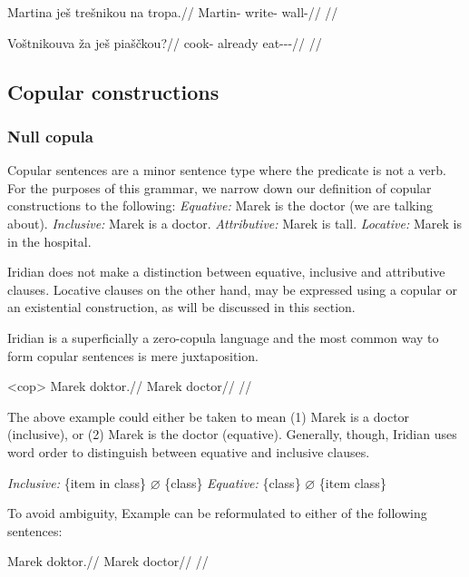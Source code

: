 \pex
\begingl
\gla Martina ješ trešnikou na tropa.//
\glb Martin-\Acc{} \Exst{} write- \Loc{} wall-\Acc{}//
\glft {}//
\endgl
\xe

\pex
\begingl
\gla Voštnikouva ža ješ piaščkou?//
\glb cook- already \Exst{} eat-\Av{}-\Pf{}-\Nz{}//
\glft {}//
\endgl
\xe

\subsection{Copular constructions}
\subsubsection{Null copula}

Copular sentences are a minor sentence type where the predicate is not a verb.
For the purposes of this grammar, we narrow down our definition of copular
constructions to the following:
\pex
\a \textit{Equative:} Marek is the doctor (we are talking about).
\a \textit{Inclusive:} Marek is a doctor.
\a \textit{Attributive:} Marek is tall.
\a \textit{Locative:} Marek is in the hospital.
\xe

Iridian does not make a distinction between equative, inclusive and attributive
clauses. Locative clauses on the other hand, may be expressed using a copular or
an existential construction, as will be discussed in this section.

Iridian is a superficially a zero-copula language and the most common way to
form copular sentences is mere juxtaposition.

\pex<cop>
\begingl
\gla Marek doktor.//
\glb Marek doctor//
\glft {}//
\endgl
\xe

The above example could either be taken to mean (1) Marek is a doctor
(inclusive), or (2) Marek is the doctor (equative). Generally, though, Iridian
uses word order to distinguish between equative and inclusive clauses.

\pex
\a \textit{Inclusive:} \{item in class\} $\varnothing$ \{class\}
\a \textit{Equative:} \{class\} $\varnothing$ \{item class\}
\xe

To avoid ambiguity, Example  can be reformulated to either of the
following sentences:

\a
\begingl
\gla Marek doktor.//
\glb Marek doctor//
\glft {}//
\endgl

